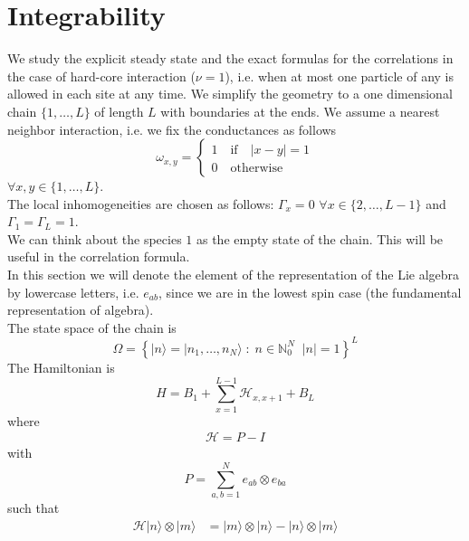 \documentclass[11pt]{article}
\numberwithin{equation}{subsection}
\newcommand{\id}{I}
\newcommand{\twoj}{\nu}
\begin{document}
\section{Integrability}\label{sec4}
We study the explicit steady state and the exact formulas for the correlations in the case of hard-core interaction ($\twoj=1$), i.e. when at most one particle of any is allowed in each site at any time. We simplify the geometry to a one dimensional chain $\{1,\ldots,L\}$ of length $L$ with boundaries at the ends. We assume a nearest neighbor interaction, i.e. we fix the conductances as follows
\begin{equation}
\omega_{x,y}=\begin{cases}
    1\quad \text{if}\quad |x-y|=1\\
    0\quad \text{otherwise}
\end{cases}
\end{equation}
$\forall x,y\in \{1,\ldots,L\}$.\\
The local inhomogeneities are chosen as follows: $\Gamma_{x}=0$ $\forall x\in \{2,\ldots,L-1\}$ and $\Gamma_{1}=\Gamma_{L}=1$. \\
We can think about the species $1$ as the empty state of the chain. This will be useful in the correlation formula.\\
In this section we will denote the element of the representation of the Lie algebra by lowercase letters, i.e. $e_{ab}$, since we are in the lowest spin case (the fundamental representation of algebra). \\
The state space of the chain is 
\begin{equation}
	\Omega=\left\{|n\rangle=|n_{1},\ldots,n_{N}\rangle\;:\;n\in\mathbb{N}_0^N\;\;|n|=1\right\}^{L}
\end{equation} 
The Hamiltonian is
\begin{equation}\label{hamiltonian}
	H=B_{1}+\sum_{x=1}^{L-1}\mathcal{H}_{x,x+1}+B_{L}
\end{equation}
where
\begin{equation}
	\begin{split}
		\mathcal{H}=P-\id
	\end{split}
\end{equation}
with 
\begin{equation}
	P=\sum_{a,b=1}^Ne_{ab}\otimes e_{ba}
\end{equation} 
such that
\begin{equation}
	\begin{split}
		\mathcal{H}|n\rangle\otimes   |m\rangle&=|m\rangle \otimes |n\rangle-|n\rangle \otimes|m\rangle
	\end{split}
\end{equation}
\end{document}
